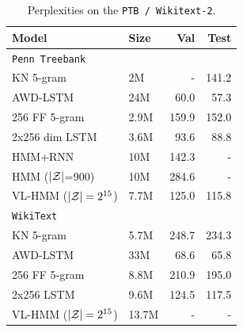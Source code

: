 \documentclass[11pt,a4paper]{article}
\begin{document}

\begin{table}[!t]
\centering
\begin{tabular}{llrr}
\toprule
Model & Size & Val  & Test \\
\midrule
\texttt{Penn Treebank}\\
\midrule
KN 5-gram   & 2M & - & 141.2\\
AWD-LSTM  & 24M & 60.0 & 57.3\\
256 FF 5-gram  & 2.9M     & 159.9      & 152.0  \\
2x256 dim LSTM  & 3.6M     & 93.6       & 88.8   \\
HMM+RNN   & 10M & 142.3 & -\\
HMM ($|\mathcal{Z}|$=900) & 10M & 284.6 & -\\
VL-HMM ($|\mathcal{Z}|=2^{15}$)   & 7.7M     & 125.0      & 115.8  \\
\midrule
\texttt{WikiText}\\
\midrule
KN 5-gram & 5.7M       & 248.7 & 234.3\\
AWD-LSTM & 33M & 68.6 & 65.8\\
256 FF 5-gram        & 8.8M    & 210.9  & 195.0\\
2x256  LSTM     & 9.6M    & 124.5  & 117.5\\
VL-HMM ($|\mathcal{Z}|=2^{15}$)           & 13.7M   & -      & -\\
\bottomrule
\end{tabular}
\caption{\label{tbl:ppl}
Perplexities on the \texttt{PTB / Wikitext-2}.
}
\end{table}
\end{document}
